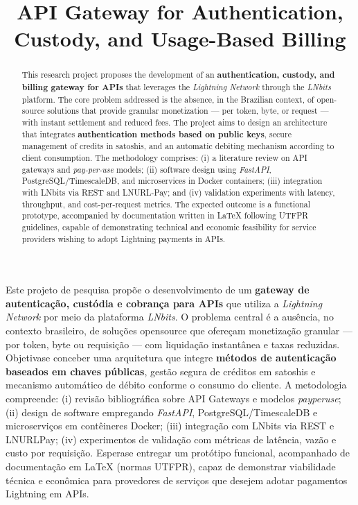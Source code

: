 \documentclass[openright]{normas-utf-tex}
\title{API Gateway for Authentication, Custody, and Usage-Based Billing} %
\begin{document}
\capa 
\folhaderosto 

\sumario 


\begin{resumo}
    Este projeto de pesquisa propõe o desenvolvimento de um \textbf{gateway de autenticação, custódia e cobrança para APIs} que utiliza a \emph{Lightning Network} por meio da plataforma \textit{LNbits}. O problema central é a ausência, no contexto brasileiro, de soluções open\-source que ofereçam monetização granular — por token, byte ou requisição — com liquidação instantânea e taxas reduzidas. Objetiva\-se conceber uma arquitetura que integre \textbf{métodos de autenticação baseados em chaves públicas}, gestão segura de créditos em satoshis e mecanismo automático de débito conforme o consumo do cliente. A metodologia compreende: (i) revisão bibliográfica sobre API Gateways e modelos \textit{pay\-per\-use}; (ii) design de software empregando \textit{FastAPI}, PostgreSQL/TimescaleDB e microserviços em contêineres Docker; (iii) integração com LNbits via REST e LNURL\-Pay; (iv) experimentos de validação com métricas de latência, vazão e custo por requisição. Espera\-se entregar um protótipo funcional, acompanhado de documentação em LaTeX (normas UTFPR), capaz de demonstrar viabilidade técnica e econômica para provedores de serviços que desejem adotar pagamentos Lightning em APIs.
\end{resumo}

\begin{abstract}
    This research project proposes the development of an \textbf{authentication, custody, and billing gateway for APIs} that leverages the \emph{Lightning Network} through the \textit{LNbits} platform. The core problem addressed is the absence, in the Brazilian context, of open-source solutions that provide granular monetization --- per token, byte, or request --- with instant settlement and reduced fees. The project aims to design an architecture that integrates \textbf{authentication methods based on public keys}, secure management of credits in satoshis, and an automatic debiting mechanism according to client consumption. The methodology comprises: (i) a literature review on API gateways and \textit{pay-per-use} models; (ii) software design using \textit{FastAPI}, PostgreSQL/TimescaleDB, and microservices in Docker containers; (iii) integration with LNbits via REST and LNURL-Pay; and (iv) validation experiments with latency, throughput, and cost-per-request metrics. The expected outcome is a functional prototype, accompanied by documentation written in LaTeX following UTFPR guidelines, capable of demonstrating technical and economic feasibility for service providers wishing to adopt Lightning payments in APIs.
\end{abstract}
\end{document}
